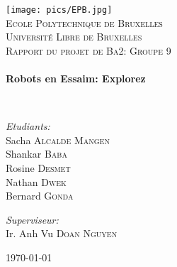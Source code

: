 \begin{titlepage}
\begin{center}

\texttt{[image: pics/EPB.jpg]}~\\[1cm]

\textsc{\LARGE Ecole Polytechnique de Bruxelles\\Université Libre de Bruxelles}\\[1.5cm]

\textsc{\Large Rapport du projet de Ba2: Groupe 9}\\[0.5cm]

\HRule \\[0.4cm]
{ \huge \bfseries Robots en Essaim: Explorez\\[0.4cm] }

\HRule \\[1.5cm]

\begin{minipage}{0.49\textwidth}
\begin{flushleft} \large
\emph{Etudiants:}\\
Sacha \textsc{Alcalde Mangen}\\
Shankar \textsc{Baba}\\
Rosine \textsc{Desmet}\\
Nathan \textsc{Dwek}\\
Bernard \textsc{Gonda}\\
\end{flushleft}
\end{minipage}
\begin{minipage}{0.49\textwidth}
\begin{flushright} \large
\emph{Superviseur:} \\
Ir. Anh Vu \textsc{Doan Nguyen}
\end{flushright}
\end{minipage}

\vfill

{\large \today}

\end{center}
\end{titlepage}